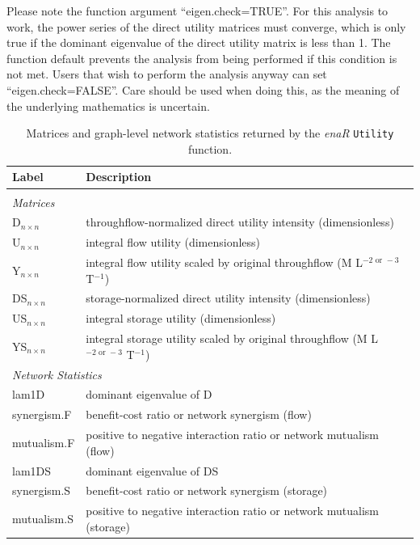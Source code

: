 \documentclass[11pt]{article}
\begin{document}
Please note the function argument ``eigen.check=TRUE''.  For this
analysis to work, the power series of the direct utility matrices must
converge, which is only true if the dominant eigenvalue of the direct
utility matrix is less than 1. The function default prevents the
analysis from being performed if this condition is not met. Users that
wish to perform the analysis anyway can set ``eigen.check=FALSE''.  Care
should be used when doing this, as the meaning of the underlying
mathematics is uncertain.  

\begin{table}[t]
  \caption{Matrices and graph-level network statistics returned by the \textit{enaR}
    \texttt{Utility} function.}\label{tab:utility}
\center
\begin{small}
  \begin{tabular}{l l}
    \textbf{Label} & \textbf{Description} \\ \hline \\[-1.5ex]
    \multicolumn{2}{l}{\textit{Matrices}} \\[1ex]
    D$_{n\times n}$ & throughflow-normalized direct utility intensity (dimensionless)\\
    U$_{n\times n}$ & integral flow utility (dimensionless) \\
    Y$_{n\times n}$ & integral flow utility scaled by original throughflow (M L$^{-2 \textrm{ or } -3}$ T$^{-1}$)\\
    DS$_{n\times n}$ & storage-normalized direct utility intensity (dimensionless)\\
    US$_{n\times n}$ & integral storage utility (dimensionless) \\
    YS$_{n\times n}$ & integral storage utility scaled by original throughflow (M L$^{-2  \textrm{ or }  -3}$ T$^{-1}$)\\ [1ex]
    \multicolumn{2}{l}{\textit{Network Statistics}} \\[1ex]
    lam1D & dominant eigenvalue of D\\
    synergism.F & benefit-cost ratio or network synergism (flow)\\
    mutualism.F & positive to negative interaction ratio or network mutualism (flow)\\
    lam1DS & dominant eigenvalue of DS\\
    synergism.S & benefit-cost ratio or network synergism (storage) \\
    mutualism.S & positive to negative interaction ratio or network mutualism (storage)\\ \hline
\end{tabular}
\end{small}
\end{table}
\end{document}
